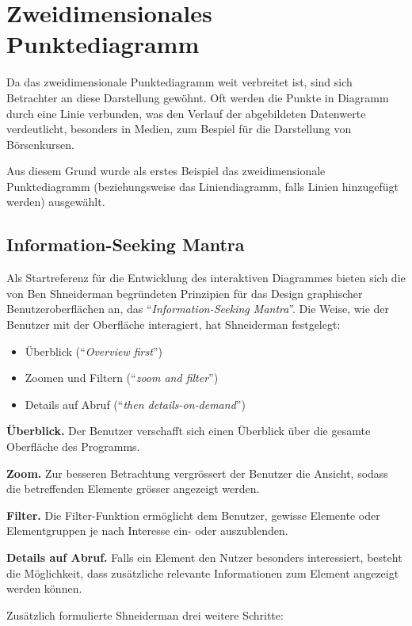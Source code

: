 \newpage
\section{Zweidimensionales Punktediagramm}

Da das zweidimensionale Punktediagramm weit verbreitet ist, sind sich Betrachter an diese Darstellung gewöhnt. Oft werden die Punkte in Diagramm durch eine Linie verbunden, was den Verlauf der abgebildeten Datenwerte verdeutlicht, besonders in Medien, zum Bespiel für die Darstellung von Börsenkursen. 

Aus diesem Grund wurde als erstes Beispiel das zweidimensionale Punktediagramm (beziehungsweise das Liniendiagramm, falls Linien hinzugefügt werden) ausgewählt.

\subsection{Information-Seeking Mantra}

Als Startreferenz für die Entwicklung des interaktiven Diagrammes bieten sich die von Ben Shneiderman begründeten Prinzipien für das Design graphischer Benutzeroberflächen an, das "`\textit{Information-Seeking Mantra}"'. Die Weise, wie der Benutzer mit der Oberfläche interagiert, hat Shneiderman \cite{shneiderman} festgelegt:

\begin{itemize}
	\item Überblick ("`\textit{Overview first}"')
	\item Zoomen und Filtern ("`\textit{zoom and filter}"')
	\item Details auf Abruf ("`\textit{then details-on-demand}"')
\end{itemize}

\textbf{Überblick.} Der Benutzer verschafft sich einen Überblick über die gesamte Oberfläche des Programms.

\textbf{Zoom.} Zur besseren Betrachtung vergrössert der Benutzer die Ansicht, sodass die betreffenden Elemente grösser angezeigt werden.

\textbf{Filter.} Die Filter-Funktion ermöglicht dem Benutzer, gewisse Elemente oder Elementgruppen je nach Interesse ein- oder auszublenden.

\textbf{Details auf Abruf.} Falls ein Element den Nutzer besonders interessiert, besteht die Möglichkeit, dass zusätzliche relevante Informationen zum Element angezeigt werden können.

Zusätzlich formulierte Shneiderman drei weitere Schritte:

